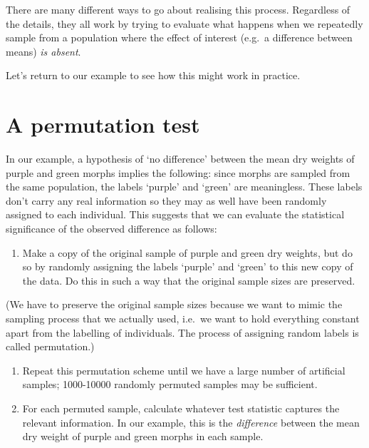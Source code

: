 \documentclass[]{book}
\providecommand{\tightlist}{%
  \setlength{\itemsep}{0pt}\setlength{\parskip}{0pt}}
\begin{document}
There are many different ways to go about realising this process.
Regardless of the details, they all work by trying to evaluate what
happens when we repeatedly sample from a population where the effect of
interest (e.g.~a difference between means) \emph{is absent}.

Let's return to our example to see how this might work in practice.

\section{A permutation test}\label{a-permutation-test}

In our example, a hypothesis of `no difference' between the mean dry
weights of purple and green morphs implies the following: since morphs
are sampled from the same population, the labels `purple' and `green'
are meaningless. These labels don't carry any real information so they
may as well have been randomly assigned to each individual. This
suggests that we can evaluate the statistical significance of the
observed difference as follows:

\begin{enumerate}
\def\labelenumi{\arabic{enumi}.}
\tightlist
\item
  Make a copy of the original sample of purple and green dry weights,
  but do so by randomly assigning the labels `purple' and `green' to
  this new copy of the data. Do this in such a way that the original
  sample sizes are preserved.
\end{enumerate}

(We have to preserve the original sample sizes because we want to mimic
the sampling process that we actually used, i.e.~we want to hold
everything constant apart from the labelling of individuals. The process
of assigning random labels is called permutation.)

\begin{enumerate}
\def\labelenumi{\arabic{enumi}.}
\setcounter{enumi}{1}
\item
  Repeat this permutation scheme until we have a large number of
  artificial samples; 1000-10000 randomly permuted samples may be
  sufficient.
\item
  For each permuted sample, calculate whatever test statistic captures
  the relevant information. In our example, this is the
  \emph{difference} between the mean dry weight of purple and green
  morphs in each sample.
\end{enumerate}
\end{document}
